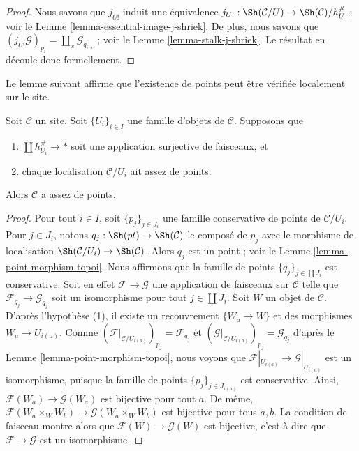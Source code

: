 \begin{proof}
Nous savons que $j_{U!}$ induit une équivalence
$j_{U!} : \Sh(\mathcal{C}/U) \to \Sh(\mathcal{C})/h_U^\#$ ; voir le
Lemme \ref{lemma-essential-image-j-shriek}.
De plus, nous savons que
$(j_{U!}\mathcal{G})_{p_i} = \coprod_x \mathcal{G}_{q_{i, x}}$ ; voir le
Lemme \ref{lemma-stalk-j-shriek}.
Le résultat en découle donc formellement.
\end{proof}

\noindent
Le lemme suivant affirme que l’existence de points peut être vérifiée
localement sur le site.

\begin{lemma}
\label{lemma-enough-points-local}
Soit $\mathcal{C}$ un site. Soit $\{U_i\}_{i \in I}$ une famille
d’objets de $\mathcal{C}$. Supposons que
\begin{enumerate}
\item $\coprod h_{U_i}^\# \to *$ soit une application surjective de faisceaux, et
\item chaque localisation $\mathcal{C}/U_i$ ait assez de points.
\end{enumerate}
Alors $\mathcal{C}$ a assez de points.
\end{lemma}

\begin{proof}
Pour tout $i \in I$, soit $\{p_j\}_{j \in J_i}$ une famille conservative
de points de $\mathcal{C}/U_i$. Pour $j \in J_i$, notons
$q_j : \Sh(pt) \to \Sh(\mathcal{C})$ le composé
de $p_j$ avec le morphisme de localisation
$\Sh(\mathcal{C}/U_i) \to \Sh(\mathcal{C})$.
Alors $q_j$ est un point ; voir le
Lemme \ref{lemma-point-morphism-topoi}.
Nous affirmons que la famille de points $\{q_j\}_{j \in \coprod J_i}$
est conservative.
Soit en effet $\mathcal{F} \to \mathcal{G}$ une application de faisceaux
sur $\mathcal{C}$ telle que $\mathcal{F}_{q_j} \to \mathcal{G}_{q_j}$
soit un isomorphisme pour tout $j \in \coprod J_i$.
Soit $W$ un objet de $\mathcal{C}$.
D’après l’hypothèse (1), il existe un recouvrement $\{W_a \to W\}$ et
des morphismes $W_a \to U_{i(a)}$.
Comme $(\mathcal{F}|_{\mathcal{C}/U_{i(a)}})_{p_j} = \mathcal{F}_{q_j}$
et $(\mathcal{G}|_{\mathcal{C}/U_{i(a)}})_{p_j} = \mathcal{G}_{q_j}$ d’après le
Lemme \ref{lemma-point-morphism-topoi},
nous voyons que
$\mathcal{F}|_{U_{i(a)}} \to \mathcal{G}|_{U_{i(a)}}$ est un isomorphisme,
puisque la famille de points $\{p_j\}_{j \in J_{i(a)}}$ est conservative.
Ainsi, $\mathcal{F}(W_a) \to \mathcal{G}(W_a)$ est bijective pour tout $a$.
De même, $\mathcal{F}(W_a \times_W W_b) \to \mathcal{G}(W_a \times_W W_b)$
est bijective pour tous $a, b$.
La condition de faisceau montre alors que
$\mathcal{F}(W) \to \mathcal{G}(W)$ est bijective, c’est-à-dire que
$\mathcal{F} \to \mathcal{G}$ est un isomorphisme.
\end{proof}

